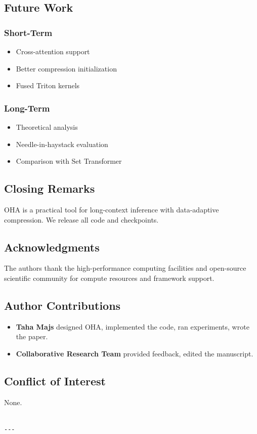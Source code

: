 \subsection{Future Work}

\subsubsection{Short-Term}
\begin{itemize}
\item Cross-attention support
\item Better compression initialization
\item Fused Triton kernels

\end{itemize}
\subsubsection{Long-Term}
\begin{itemize}
\item Theoretical analysis
\item Needle-in-haystack evaluation
\item Comparison with Set Transformer

\end{itemize}
\subsection{Closing Remarks}

OHA is a practical tool for long-context inference with data-adaptive 
compression. We release all code and checkpoints.

\subsection{Acknowledgments}

The authors thank the high-performance computing facilities and open-source scientific community for compute resources and framework support.

\subsection{Author Contributions}

\begin{itemize}
\item \textbf{Taha Majs} designed OHA, implemented the code, ran experiments,
  wrote the paper.
\item \textbf{Collaborative Research Team} provided feedback, edited the manuscript.

\end{itemize}
\subsection{Conflict of Interest}

None.
\begin{lstlisting}

---
\end{lstlisting}